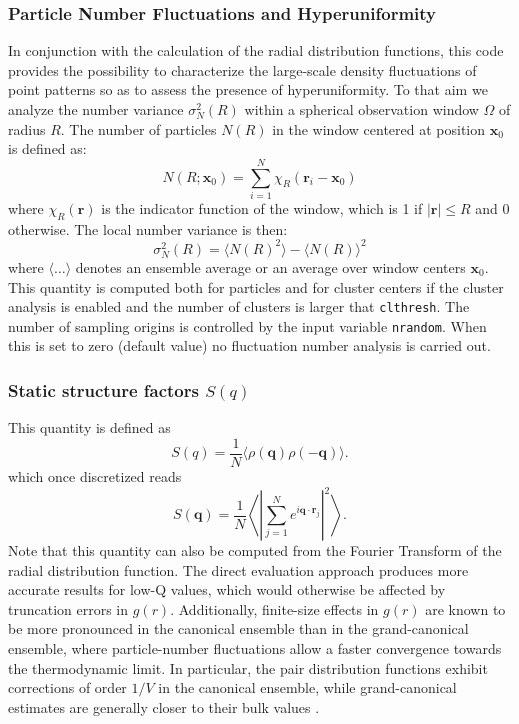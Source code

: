 \documentclass[final,1p,times]{elsarticle}
\begin{document}
\subsubsection{Particle Number Fluctuations and Hyperuniformity}
In conjunction with the calculation of the radial distribution
functions, this code provides the possibility to characterize the
large-scale density fluctuations of  point patterns so as to assess
the presence of hyperuniformity\cite{Torquato2018a}. To that aim we analyze the
number variance $\sigma_N^2(R)$ within a spherical observation window
$\Omega$ of radius $R$. The number of particles $N(R)$ in the window
centered at position $\mathbf{x}_0$ is defined as:
\begin{equation}
N(R;\mathbf{x}_0) = \sum_{i=1}^{N} \chi_R(\mathbf{r}_i -
  \mathbf{x}_0)
\end{equation}
where $\chi_R(\mathbf{r})$ is the
indicator function of the window, which is 1 if $|\mathbf{r}| \le R$
and 0 otherwise. The local number variance is
then:
\begin{equation}
\sigma_N^2(R) = \langle N(R)^2 \rangle - \langle N(R) \rangle^2
\end{equation}
where $\langle \dots \rangle$ denotes an
ensemble average or an average over window centers
$\mathbf{x}_0$. This quantity is computed both for particles and for cluster centers
if the cluster analysis is enabled and the number of clusters is
larger that {\tt clthresh}. The number of sampling origins is
controlled by the input variable {\tt nrandom}. When this is set to
zero (default value) no fluctuation number analysis is carried out. 



\subsubsection{Static structure factors $S(q)$}

This quantity is defined as
  \begin{equation}
S(q)=\frac{1}{N}\langle \rho(\mathbf q)\rho(-\mathbf q)\rangle .
\end{equation}
  which once discretized reads
  \begin{equation}
S(\mathbf{q}) = \frac{1}{N}
\left\langle
\left| \sum_{j=1}^{N} e^{i \mathbf{q} \cdot \mathbf{r}_j} \right|^2
\right\rangle .
\end{equation}
Note that this quantity can also be computed from the Fourier
Transform of the radial distribution function. The direct evaluation
approach produces more accurate results for low-Q values, which would
otherwise be 
affected by truncation errors in $g(r)$. Additionally, finite-size
effects in $g(r)$ are known
to be more pronounced in the canonical ensemble than in the
grand-canonical ensemble, where particle-number fluctuations allow a
faster convergence towards the thermodynamic limit. In particular, the
pair distribution functions exhibit corrections of order $1/V$ in the
canonical ensemble, while grand-canonical estimates are generally
closer to their bulk values \cite{Lebowitz1961,Wang2017,Rogers2018}. 
\end{document}
